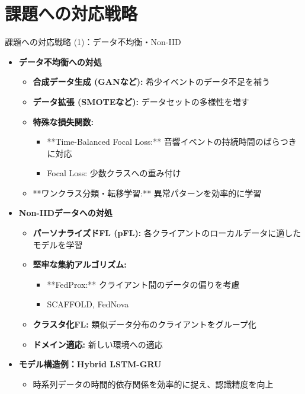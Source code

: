 \documentclass[unicode,12pt,aspectratio=169,dvipdfmx]{beamer}
\begin{document}
\section{課題への対応戦略}
\begin{frame}{課題への対応戦略 (1)：データ不均衡・Non-IID}
\begin{itemize}
    \item \textbf{データ不均衡への対処}
    \begin{itemize}
        \item \textbf{合成データ生成 (GANなど):} 希少イベントのデータ不足を補う
        \item \textbf{データ拡張 (SMOTEなど):} データセットの多様性を増す
        \item \textbf{特殊な損失関数:}
        \begin{itemize}
            \item **Time-Balanced Focal Loss:** 音響イベントの持続時間のばらつきに対応
            \item Focal Loss: 少数クラスへの重み付け
        \end{itemize}
        \item **ワンクラス分類・転移学習:** 異常パターンを効率的に学習
    \end{itemize}
    \item \textbf{Non-IIDデータへの対処}
    \begin{itemize}
        \item \textbf{パーソナライズドFL (pFL):} 各クライアントのローカルデータに適したモデルを学習
        \item \textbf{堅牢な集約アルゴリズム:}
        \begin{itemize}
            \item **FedProx:** クライアント間のデータの偏りを考慮
            \item SCAFFOLD, FedNova
        \end{itemize}
        \item \textbf{クラスタ化FL:} 類似データ分布のクライアントをグループ化
        \item \textbf{ドメイン適応:} 新しい環境への適応
    \end{itemize}
    \item \textbf{モデル構造例：Hybrid LSTM-GRU}
    \begin{itemize}
        \item 時系列データの時間的依存関係を効率的に捉え、認識精度を向上
    \end{itemize}
\end{itemize}
\end{frame}
\end{document}
